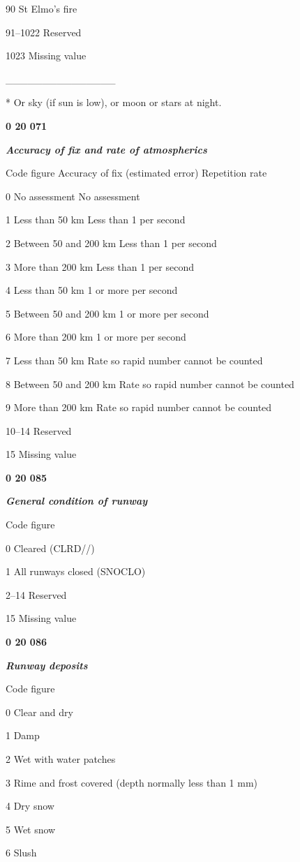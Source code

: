 90 St Elmo's fire

91--1022 Reserved

1023 Missing value

\_\_\_\_\_\_\_\_\_\_\_\_\_\_\_

* Or sky (if sun is low), or moon or stars at night.

\textbf{0 20 071}

\emph{\textbf{Accuracy of fix and rate of atmospherics}}

Code figure Accuracy of fix (estimated error) Repetition rate

0 No assessment No assessment

1 Less than 50 km Less than 1 per second

2 Between 50 and 200 km Less than 1 per second

3 More than 200 km Less than 1 per second

4 Less than 50 km 1 or more per second

5 Between 50 and 200 km 1 or more per second

6 More than 200 km 1 or more per second

7 Less than 50 km Rate so rapid number cannot be counted

8 Between 50 and 200 km Rate so rapid number cannot be counted

9 More than 200 km Rate so rapid number cannot be counted

10--14 Reserved

15 Missing value

\textbf{0 20 085}

\emph{\textbf{General condition of runway}}

Code figure

0 Cleared (CLRD//)

1 All runways closed (SNOCLO)

2--14 Reserved

15 Missing value

\textbf{0 20 086}

\emph{\textbf{Runway deposits}}

Code figure

0 Clear and dry

1 Damp

2 Wet with water patches

3 Rime and frost covered (depth normally less than 1 mm)

4 Dry snow

5 Wet snow

6 Slush

